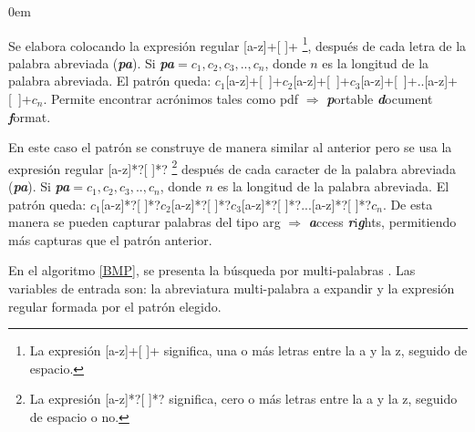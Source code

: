 \begin{description}
\itemsep0em%
\item[Patrón acrónimo:] Se elabora colocando la expresión regular [a-z]+[ ]+ \footnote[1]{La expresión [a-z]+[ ]+ significa, una o más letras entre la a y la z, seguido de espacio.}, después de cada letra de la palabra abreviada (\textit{\textbf{pa}}). Si \textit{\textbf{pa}}$=c_{1},c_{2},c_{3},..,c_{n}$, donde $n$ es la longitud de la palabra abreviada. El patrón queda: \mbox{$c_{1}$[a-z]+[ ]+$c_{2}$[a-z]+[ ]+$c_{3}$[a-z]+[ ]+..[a-z]+[ ]+$c_{n}$}. Permite encontrar acrónimos tales como \textsf{pdf} $\Rightarrow$ \textbf{\textit{p}}ortable \textbf{\textit{d}}ocument \textbf{\textit{f}}ormat.

\item[Patrón de Combinación de Palabras:] En este caso el patrón se construye de manera similar al anterior pero se usa la expresión regular [a-z]*?[ ]*? \footnote[2]{La expresión [a-z]*?[ ]*? significa, cero o más letras entre la a y la z, seguido de espacio o no.} después de cada caracter de la palabra abreviada (\textit{\textbf{pa}}). Si \textit{\textbf{pa}}$=c_{1},c_{2},c_{3},..,c_{n}$, donde $n$ es la longitud de la palabra abreviada. El patrón queda: $c_{1}$[a-z]*?[ ]*?$c_{2}$[a-z]*?[ ]*?$c_{3}$[a-z]*?[ ]*?...[a-z]*?[ ]*?$c_{n}$. De esta manera se pueden capturar palabras del tipo \textsf{arg} $\Rightarrow$ \textbf{\textit{a}}ccess \textbf{\textit{r}}i\textbf{\textit{g}}hts, permitiendo más capturas que el patrón anterior.
\end{description}



En el algoritmo \ref{BMP}, se presenta la búsqueda por multi-palabras \cite{EZH08}. Las variables de entrada son: la abreviatura multi-palabra a expandir y la expresión regular formada por el patrón elegido.

